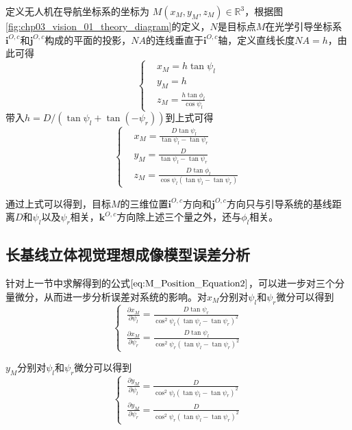 定义无人机在导航坐标系的坐标为 $M(x_M, y_M, z_M)\in \mathbb{R}^3 $，根据图\ref{fig:chp03_vision_01_theory_diagram}的定义，$N$是目标点$M$在光学引导坐标系$\mathbf{i}^{O,c}$和$\mathbf{j}^{O,c}$构成的平面的投影，$NA$的连线垂直于$\mathbf{i}^{O,c}$轴，定义直线长度$NA = h$，由此可得
\begin{equation}
\left \{
\begin{aligned}
&x_M = h \tan \psi_l  \\
&y_M = h \\
&z_M = \frac{h\tan \phi_l}{\cos \psi_l}
\end{aligned} \right.
\label{eq:M_Positon_Equation}
\end{equation}
带入$h=D/(\tan \psi_l + \tan (-\psi_r))$到上式可得
\begin{equation}
\left \{
\begin{aligned}
\label{eq:M_Position_Equation2}
&x_M =  \frac{D\tan \psi_l}{\tan \psi_l - \tan \psi_r}            \\
&y_M =  \frac{D}{\tan \psi_l - \tan \psi_r} \\
&z_M  = \frac{D\tan \phi_l}{\cos \psi_l(\tan \psi_l - \tan \psi_r)}
\end{aligned} \right. 
\end{equation}

通过上式可以得到，目标$M$的三维位置$\mathbf{i}^{O,c}$方向和$\mathbf{j}^{O,c}$方向只与引导系统的基线距离$D$和$\psi_l$以及$\psi_r$相关，$\mathbf{k}^{O,c}$方向除上述三个量之外，还与$\phi_l$相关。

\subsection{长基线立体视觉理想成像模型误差分析}
针对上一节中求解得到的公式$\ref{eq:M_Position_Equation2}$，可以进一步对三个分量微分，从而进一步分析误差对系统的影响。对$x_M$分别对$\psi_l$和$\psi_r$微分可以得到
\begin{equation}
\left\{ \,
\begin{aligned}
\frac{ \partial x_M}{ \partial \psi_l} = \frac{D \tan \psi_r}{ \cos^2 \psi_l (\tan \psi_l - \tan \psi_r)^2} \\
\frac{ \partial x_M}{\partial \psi_r} = \frac{D \tan \psi_l}{\cos^2 \psi_r (\tan \psi_l - \tan \psi_r)^2} 
\end{aligned}
\right.
\end{equation}

$y_M$分别对$\psi_l$和$\psi_r$微分可以得到
\begin{equation}
\left\{ \,
\begin{aligned}
\frac{\partial y_M}{\partial \psi_l} = \frac{ D}{\cos^2 \psi_l (\tan \psi_l - \tan \psi_r)^2} \\
\frac{\partial y_M}{\partial \psi_r} = \frac{D}{\cos^2 \psi_r (\tan \psi_l - \tan \psi_r)^2} 
\end{aligned}
\right.	
\end{equation}

